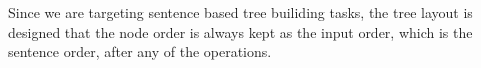 Since we are targeting sentence based tree builiding tasks, the tree
layout is designed that the node order  is always kept as the input
order, which is the sentence order, after any of the operations. 

%
%
%
